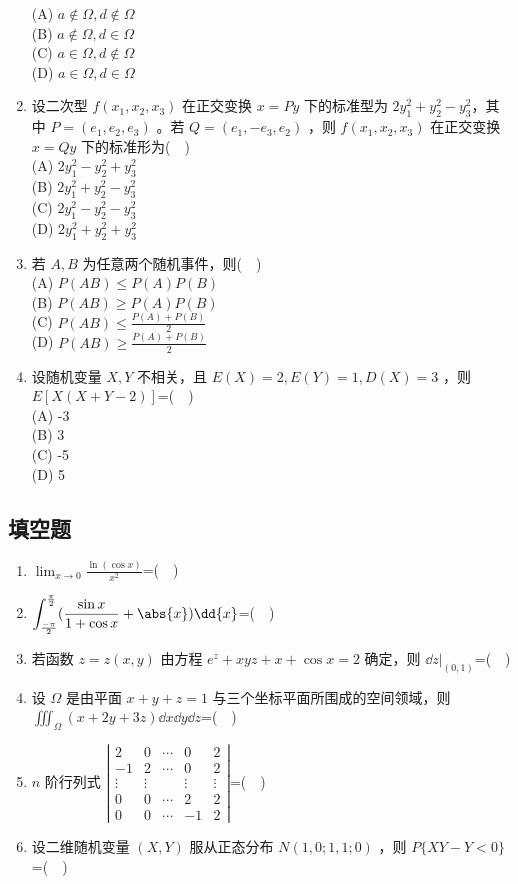 \begin{enumerate}
(A) $a\notin \Omega,d\notin \Omega$ \\
(B) $a\notin \Omega,d\in \Omega$\\
(C) $a\in \Omega,d\notin \Omega$\\
(D) $a\in \Omega,d\in \Omega$\\
\item 设二次型 $f(x_1,x_2,x_3)$ 在正交变换  $x=Py$ 下的标准型为 $2y_1^2+y_2^2-y_3^2$，其中 $P=(e_1,e_2,e_3)$ 。若 $Q=(e_1,-e_3,e_2)$ ，则 $f(x_1,x_2,x_3)$  在正交变换 $x=Qy$  下的标准形为($\quad$)\\
(A) $2y_1^2-y_2^2+y_3^2$\\
(B) $2y_1^2+y_2^2-y_3^2$\\
(C) $2y_1^2-y_2^2-y_3^2$\\
(D) $2y_1^2+y_2^2+y_3^2$
\item 若 $A,B$ 为任意两个随机事件，则($\quad$)\\
(A) $P(AB)\le P(A)P(B)$\\
(B) $P(AB) \ge P(A)P(B)$\\
(C) $\displaystyle P(AB)\le \frac{P(A)+P(B)}{2}$\\
(D) $\displaystyle P(AB)\ge \frac{P(A)+P(B)}{2}$
\item  设随机变量 $X,Y$ 不相关，且 $E(X)=2,E(Y)=1,D(X)=3$  ，则 $E[X(X+Y-2)]$=($\quad$)\\
(A) -3\\
(B) 3\\
(C) -5\\
(D) 5
\end{enumerate}
\subsection{填空题}
\begin{enumerate}
\item $\displaystyle \lim_{x \to 0} \frac{\ln(\cos x)}{x^2}$=($\quad$)
\item $\displaystyle \int_\frac{-\pi}{2}^\frac{\pi}{2}(\frac{\sin x}{1+\cos x}+\abs{x})\dd{x}$=($\quad$)
\item 若函数 $z=z(x,y)$ 由方程 $e^z+xyz+x+\cos x=2$ 确定，则 $\dd{z}|_{(0,1)}$=($\quad$)
\item 设 $\Omega$ 是由平面 $x+y+z=1$ 与三个坐标平面所围成的空间领域，则$\displaystyle {\iiint}_{\Omega}(x+2y+3z)\dd{x}\dd{y}\dd{z}$=($\quad$)
\item $n$ 阶行列式 $\left|\begin{array}{ccccc}2 & 0 & \cdots & 0 & 2 \\ -1 & 2 & \cdots & 0 & 2 \\ \vdots & \vdots & & \vdots & \vdots \\ 0 & 0 & \cdots & 2 & 2 \\ 0 & 0 & \cdots & -1 & 2\end{array}\right|$=($\quad$)
\item 设二维随机变量 $(X,Y)$ 服从正态分布 $N(1,0;1,1;0)$  ，则 $P\{XY-Y<0\}$=($\quad$)
\end{enumerate}



